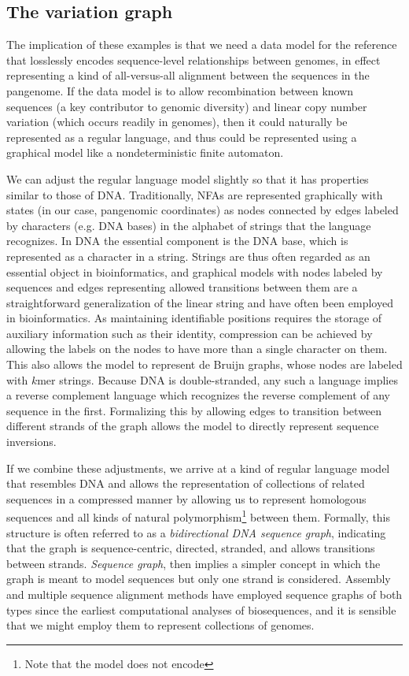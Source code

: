 \subsection{The variation graph}

The implication of these examples is that we need a data model for the reference that losslessly encodes sequence-level relationships between genomes, in effect representing a kind of all-versus-all alignment between the sequences in the pangenome.
If the data model is to allow recombination between known sequences (a key contributor to genomic diversity) and linear copy number variation (which occurs readily in genomes), then it could naturally be represented as a regular language, and thus could be represented using a graphical model like a nondeterministic finite automaton.

We can adjust the regular language model slightly so that it has properties similar to those of DNA.
Traditionally, NFAs are represented graphically with states (in our case, pangenomic coordinates) as nodes connected by edges labeled by characters (e.g. DNA bases) in the alphabet of strings that the language recognizes.
In DNA the essential component is the DNA base, which is represented as a character in a string.
Strings are thus often regarded as an essential object in bioinformatics, and graphical models with nodes labeled by sequences and edges representing allowed transitions between them are a straightforward generalization of the linear string and have often been employed in bioinformatics.
As maintaining identifiable positions requires the storage of auxiliary information such as their identity, compression can be achieved by allowing the labels on the nodes to have more than a single character on them.
This also allows the model to represent de Bruijn graphs, whose nodes are labeled with $k$mer strings.
Because DNA is double-stranded, any such a language implies a reverse complement language which recognizes the reverse complement of any sequence in the first.
Formalizing this by allowing edges to transition between different strands of the graph allows the model to directly represent sequence inversions.

If we combine these adjustments, we arrive at a kind of regular language model that resembles DNA and allows the representation of collections of related sequences in a compressed manner by allowing us to represent homologous sequences and all kinds of natural polymorphism\footnote{Note that the model does not encode } between them.
Formally, this structure is often referred to as a \emph{bidirectional DNA sequence graph}, indicating that the graph is sequence-centric, directed, stranded, and allows transitions between strands.
\emph{Sequence graph}, then implies a simpler concept in which the graph is meant to model sequences but only one strand is considered.
Assembly and multiple sequence alignment methods have employed sequence graphs of both types since the earliest computational analyses of biosequences, and it is sensible that we might employ them to represent collections of genomes.

